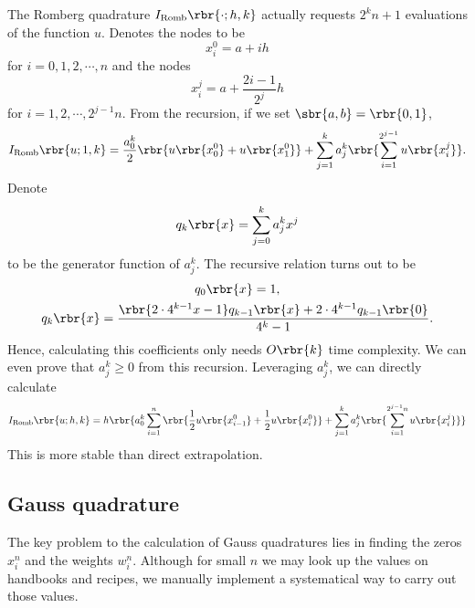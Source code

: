 \documentclass[english, nochinese]{pnote}
\begin{document}
The Romberg quadrature $ I_{\text{Romb}} \rbr{ \cdot; h, k } $ actually requests $ 2^k n + 1 $ evaluations of the function $u$. Denotes the nodes to be
\begin{equation}
x_i^0 = a + i h
\end{equation}
for $ i = 0, 1, 2, \cdots, n $
and the nodes
\begin{equation}
x_i^j = a + \frac{ 2 i - 1 }{2^j} h
\end{equation}
for $ i = 1, 2, \cdots, 2^{ j - 1 } n $. From the recursion, if we set $ \sbr{ a, b } = \rbr{ 0, 1 } $,
\begin{equation}
I_{\text{Romb}} \rbr{ u; 1, k } = \frac{a_0^k}{2} \rbr{ u \rbr{x_0^0} + u \rbr{x_1^0} } + \sum_{ j = 1 }^k a_j^k \rbr{ \sum_{ i = 1 }^{2^{ j - 1 }} u \rbr{x_i^j} }.
\end{equation}
Denote
\begin{equation}
q_k \rbr{x} = \sum_{ j = 0 }^k a_j^k x^j
\end{equation}
to be the generator function of $a_j^k$. The recursive relation turns out to be
\begin{gather}
q_0 \rbr{x} = 1, \\
q_k \rbr{x} = \frac{ \rbr{ 2 \cdot 4^{ k - 1 } x - 1 } q_{ k - 1 } \rbr{x} + 2 \cdot 4^{ k - 1 } q_{ k - 1 } \rbr{0} }{ 4^k - 1 }.
\end{gather}
Hence, calculating this coefficients only needs $ O \rbr{k} $ time complexity. We can even prove that $ a_j^k \ge 0 $ from this recursion. Leveraging $a_j^k$, we can directly calculate
\begin{equation}
I_{\text{Romb}} \rbr{ u; h, k } = h \rbr{ a_0^k \sum_{ i = 1 }^n \rbr{ \frac{1}{2} u \rbr{x_{ i - 1 }^0} + \frac{1}{2} u \rbr{x_i^0} } + \sum_{ j = 1 }^k a_j^k \rbr{ \sum_{ i = 1 }^{ 2^{ j - 1 } n } u \rbr{x_i^j} } }
\end{equation}
This is more stable than direct extrapolation.

\subsection{Gauss quadrature}

The key problem to the calculation of Gauss quadratures lies in finding the zeros $x_i^n$ and the weights $w_i^n$. Although for small $n$ we may look up the values on handbooks and recipes, we manually implement a systematical way to carry out those values.
\end{document}
